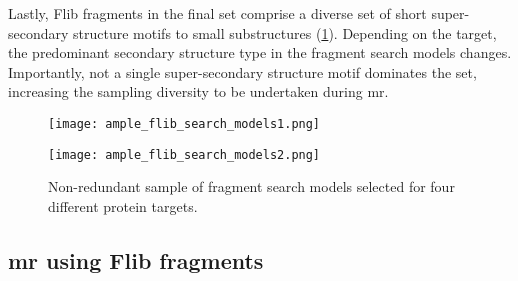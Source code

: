 

Lastly, Flib fragments in the final set comprise a diverse set of short super-secondary structure motifs to small substructures (\cref{fig:ample_flib_search_models}). Depending on the target, the predominant secondary structure type in the fragment search models changes. Importantly, not a single super-secondary structure motif dominates the set, increasing the sampling diversity to be undertaken during \gls{mr}.

\begin{figure}[H]
	\centering
	\texttt{[image: ample\_flib\_search\_models1.png]}
\end{figure}

\begin{figure}[H]\ContinuedFloat
	\centering
	\texttt{[image: ample\_flib\_search\_models2.png]}
	\caption[Fragment search models derived from Flib]{Non-redundant sample of fragment search models selected for four different protein targets.}
	\label{fig:ample_flib_search_models}
\end{figure}

\subsection{\acrlong{mr} using Flib fragments}

